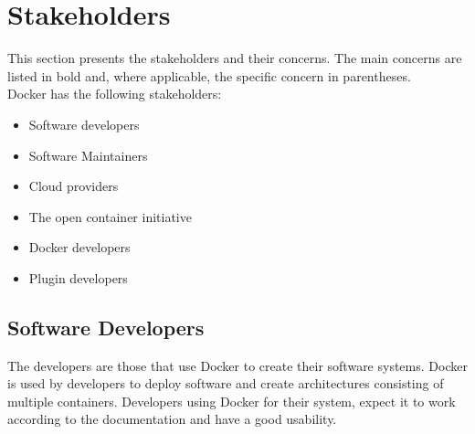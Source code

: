 
\section{Stakeholders}
\label{sec:stakeholders}
This section presents the stakeholders and their concerns. The main concerns are listed in bold and, where applicable, the specific concern in parentheses. \\

Docker has the following stakeholders:
\begin{itemize}
	\item Software developers
	\item Software Maintainers
	\item Cloud providers
	\item The open container initiative
	\item Docker developers
	\item Plugin developers
\end{itemize}

\subsection*{Software Developers}
The developers are those that use Docker to create their software systems. Docker is used by developers to deploy software and create architectures consisting of multiple containers. Developers using Docker for their system, expect it to work according to the documentation and have a good usability.

